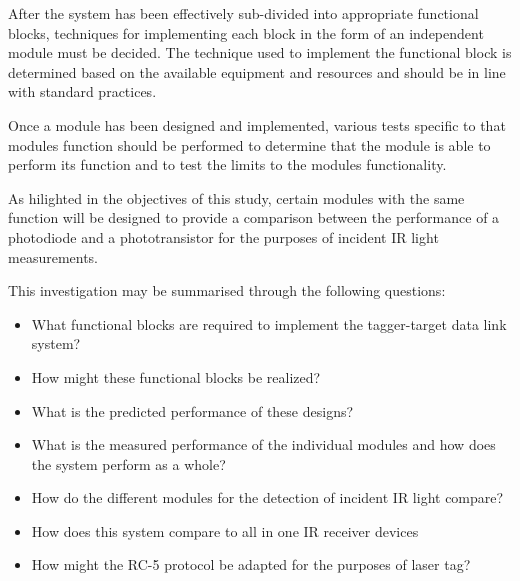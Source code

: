 After the system has been effectively sub-divided into appropriate functional blocks, techniques for implementing each block in the form of an independent module must be decided. The technique used to implement the functional block is determined based on the available equipment and resources and should be in line with standard practices.

Once a module has been designed and implemented, various tests specific to that modules function should be performed to determine that the module is able to perform its function and to test the limits to the modules functionality.

As hilighted in the objectives of this study, certain modules with the same function will be designed to provide a comparison between the performance of a photodiode and a phototransistor for the purposes of incident IR light measurements.

This investigation may be summarised through the following questions:

\begin{itemize}
	\item What functional blocks are required to implement the tagger-target data link system?
	\item How might these functional blocks be realized?
	\item What is the predicted performance of these designs?
	\item What is the measured performance of the individual modules and how does the system perform as a whole?
	\item How do the different modules for the detection of incident IR light compare?
	\item How does this system compare to all in one IR receiver devices
	\item How might the RC-5 protocol be adapted for the purposes of laser tag?

%	
\end{itemize}


